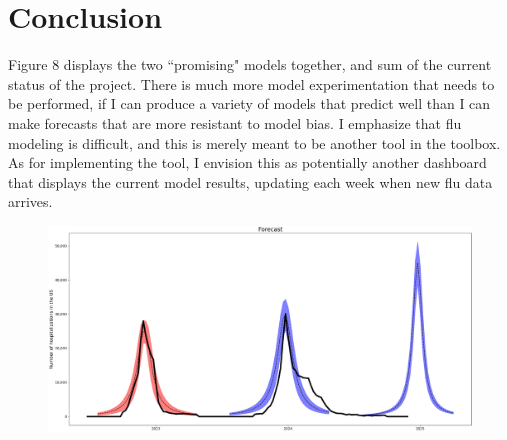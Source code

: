 \documentclass[12pt,a4paper,english]{article}
\begin{document}
\section{Conclusion}

Figure 8 displays the two ``promising" models together, and sum of the current status of the project. There is much more model experimentation that needs to be performed, if I can produce a variety of models that predict well than I can make forecasts that are more resistant to model bias. I emphasize that flu modeling is difficult, and this is merely meant to be another tool in the toolbox. As for implementing the tool, I envision this as potentially another dashboard that displays the current model results, updating each week when new flu data arrives.


	\begin{figure}[h!]
		\centering
		\includegraphics[scale=0.45]{Pictures/Forecasts.png}
		\caption{}
		\label{fig:flu_models}
	\end{figure}
\end{document}
